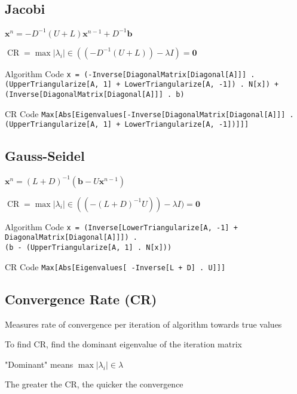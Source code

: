 \documentclass[10pt,letterpaper]{article}
\newenvironment{tight_item}
{\begin{itemize}
\setlength{\parskip}{0pt}
\setlength{\parsep}{0pt}
\setlength{\itemsep}{0pt}
\setlength{\parsep}{0pt}
\setlength{\topsep}{0pt}
\setlength{\partopsep}{0pt}
\setlength{\leftmargin}{0em}
\setlength{\labelwidth}{0em}
\setlength{\labelsep}{1em} }
{\end{itemize}}
\newenvironment{tight_desc}
{\begin{description}
\setlength{\parskip}{0pt}
\setlength{\parsep}{0pt}
\setlength{\itemsep}{0pt}
\setlength{\parsep}{0pt}
\setlength{\topsep}{0pt}
\setlength{\partopsep}{0pt}
\setlength{\leftmargin}{0em}
\setlength{\labelwidth}{0em}
\setlength{\labelsep}{1em} }
{\end{description}}
\begin{document}
\begin{multicols*}{2}
\subsection{Jacobi}
\begin{tight_item}
\item $\mathbf{x}^{n} = -D^{-1}(U + L)\mathbf{x}^{n-1}+ D^{-1}\mathbf{b}$
\item $\operatorname{CR} = \max{|\lambda_{i}|} \in ((-D^{-1}(U+L)) - \lambda I) = \mathbf{0}$
\end{tight_item}
\begin{tight_desc}
\item[Algorithm Code] \texttt{x = (-Inverse[DiagonalMatrix[Diagonal[A]]] .\\(UpperTriangularize[A, 1] + LowerTriangularize[A, -1]) . N[x]) +\\(Inverse[DiagonalMatrix[Diagonal[A]]] . b)}
\item[CR Code] \texttt{Max[Abs[Eigenvalues[-Inverse[DiagonalMatrix[Diagonal[A]]] .\\(UpperTriangularize[A, 1] + LowerTriangularize[A, -1])]]]}
\end{tight_desc}

\subsection{Gauss-Seidel}
\begin{tight_item}
\item $\mathbf{x}^{n} = (L+D)^{-1}(\mathbf{b}-U\mathbf{x}^{n-1})$
\item $\operatorname{CR} = \max{|\lambda_{i}|} \in ((-(L+D)^{-1}U)) - \lambda I) = \mathbf{0}$
\end{tight_item}
\begin{tight_desc}
\item[Algorithm Code] \texttt{x = (Inverse[LowerTriangularize[A, -1] +\\DiagonalMatrix[Diagonal[A]]]) .\\(b - (UpperTriangularize[A, 1] . N[x]))}
\item[CR Code] \texttt{Max[Abs[Eigenvalues[ -Inverse[L + D] . U]]]}
\end{tight_desc}

\subsection{Convergence Rate (CR)}
\begin{tight_item}
\item Measures rate of convergence per iteration of algorithm towards true values
\item To find CR, find the dominant eigenvalue of the iteration matrix
\item "Dominant" means $\max{ | \lambda_{i} | } \in \lambda$
\item The greater the CR, the quicker the convergence
\end{tight_item}


\end{multicols*}
\end{document}
